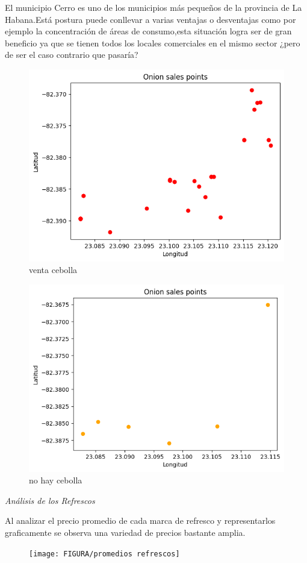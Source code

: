 \documentclass[10pt]{beamer}
\begin{document}
   	\begin{frame}
   		
   		
   		 El municipio Cerro es uno de los municipios más pequeños de la provincia de La Habana.Está postura puede conllevar a varias ventajas o desventajas como por ejemplo la concentración de áreas de consumo,esta situación logra ser de gran beneficio ya que se tienen todos los locales comerciales en el mismo sector ¿pero de ser el caso contrario que pasaría? 
   	
   		\begin{figure}
   			\centering
   			\includegraphics[width=0.3\linewidth]{FIGURA/grfdisperssión1}
   			\caption{venta cebolla}
   			\label{fig:grfdisperssion1}
   		\end{figure}
   		
   		\begin{figure}
   			\centering
   			\includegraphics[width=0.3\linewidth]{FIGURA/grafdispersión2}
   			\caption{no hay cebolla}
   			\label{fig:grafdispersion2}
   		\end{figure}
   		
   		
   	\end{frame}	
   		
  
   	
   \begin{frame}{\textit{Análisis de los Refrescos}}
   	
   	Al analizar el precio promedio de cada marca de refresco y representarlos graficamente se observa una variedad de precios bastante amplia.
   	
   	  \begin{figure}
   		\centering
   		\texttt{[image: FIGURA/promedios refrescos]}
   		\caption{}
   		\label{fig:promedios-refrescos}
     \end{figure}
   	
   \end{frame}
   	
\end{document}
